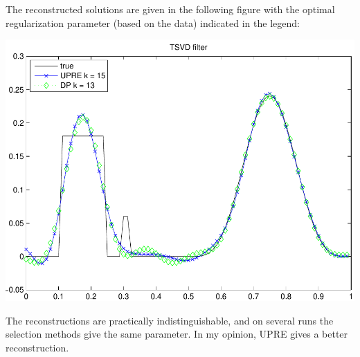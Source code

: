 \documentclass{homework}
\begin{document}
\begin{longproblem}
\begin{solution} 
The reconstructed solutions are given in the following figure with the optimal regularization parameter (based on the data) indicated in the legend:
\begin{center}
\includegraphics[width=.4\textwidth]{29b_reconstruction.pdf}
\end{center}
The reconstructions are practically indistinguishable, and on several runs the selection methods give the same parameter.  In my opinion, UPRE gives a better reconstruction. 
\end{solution}
\end{longproblem}
\end{document}
